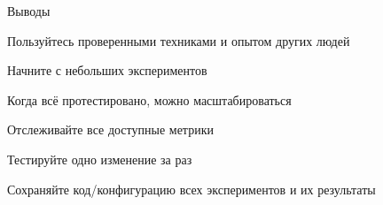 \documentclass[notes,12pt, aspectratio=169]{beamer}
\newenvironment{wideitemize}{\itemize\addtolength{\itemsep}{10pt}}{\enditemize}
\begin{document}
\begin{frame}{Выводы}
	\begin{wideitemize}
		\item  Пользуйтесь проверенными техниками и опытом других людей
		
		\item  Начните с небольших экспериментов
		
		\item  Когда всё протестировано, можно масштабироваться
		
		\item  Отслеживайте все доступные метрики
		
		\item  Тестируйте одно изменение за раз
		
		\item  Сохраняйте код/конфигурацию всех экспериментов и их результаты
		
	\end{wideitemize}
\end{frame}
\end{document}
